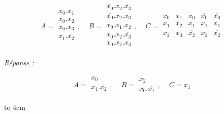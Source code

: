 \begin{enumerate} [label=\arabic*$^\circ$]
\[ A = 
\begin{array}{|c|} 
    x_0 . x_1 \\
    x_0 . x_2 \\
    x_0 . x_3 \\
    \overline{x_1} . \overline{x_2} \\     
\end{array}%
\text{, } \quad  B = \begin{array}{|c|} 
					\overline{x_0} . x_2 . \overline{x_3} \\
					\overline{x_0} . x_2 . x_3  \\
					x_0 . \overline{x_1} . \overline{x_2} \\
					x_0  . x_2 . \overline{x_3} \\
					x_0 . x_2 . x_3 \\
                  \end{array} 
                  \text{, } \quad C = \begin{array}{|c|c|c|c|c|} 
                  					x_0 & x_1 & x_0 & \overline{x_0} & \overline{x_0} \\
                  					x_1 & x_2 & x_1 & x_1 & x_1 \\
                  					x_2 & x_3 & \overline{x_2} & x_2 & \overline{x_2} \\
                                  \end{array} 
\]

\medskip 


 \textsl{Réponse :}
 
 \medskip
 
 \[ A = 
 \begin{array}{|c|}    x_0 \\ \overline{x_1} . \overline{x_2} \\   \end{array}
       \text{, } \quad B = \begin{array}{|c|} x_2 \\ x_0 . \overline{x_1} \end{array} 
           \text{, } \quad C = x_1 
 \]
 
\vspace*{4cm }

\centerline { \hfill \hbox to 4cm  { \hrulefill } \hfill }
\end{enumerate}




\ifdefined\COMPLETE
\else
    
\fi

